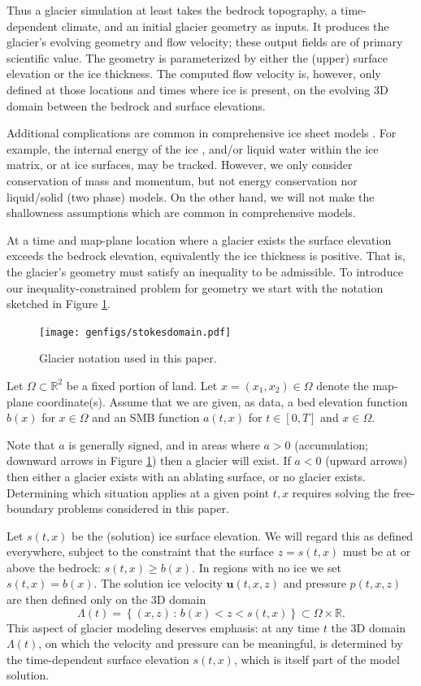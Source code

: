 \documentclass[hidelinks,onefignum,onetabnum,final]{siamart220329}  %
\newcommand{\RR}{\mathbb{R}}
\newcommand{\bu}{\mathbf{u}}
\begin{document}
Thus a glacier simulation at least takes the bedrock topography, a time-dependent climate, and an initial glacier geometry as inputs.  It produces the glacier's evolving geometry and flow velocity; these output fields are of primary scientific value.  The geometry is parameterized by either the (upper) surface elevation or the ice thickness.  The computed flow velocity is, however, only defined at those locations and times where ice is present, on the evolving 3D domain between the bedrock and surface elevations.

Additional complications are common in comprehensive ice sheet models \cite{SchoofHewitt2013}.  For example, the internal energy of the ice \cite{Aschwandenetal2012}, and/or liquid water within the ice matrix, or at ice surfaces, may be tracked.  However, we only consider conservation of mass and momentum, but not energy conservation nor liquid/solid (two phase) models.  On the other hand, we will not make the shallowness assumptions which are common in comprehensive models.

At a time and map-plane location where a glacier exists the surface elevation exceeds the bedrock elevation, equivalently the ice thickness is positive.  That is, the glacier's geometry must satisfy an inequality to be admissible.  To introduce our inequality-constrained problem for geometry we start with the notation sketched in Figure \ref{fig:stokesdomain}.

\medskip
\begin{figure}[ht]
\centering
\texttt{[image: genfigs/stokesdomain.pdf]}
\caption{Glacier notation used in this paper.}
\label{fig:stokesdomain}
\end{figure}

\medskip
Let $\Omega \subset \RR^2$ be a fixed portion of land.  Let $x=(x_1,x_2)\in\Omega$ denote the map-plane coordinate(s).  Assume that we are given, as data, a bed elevation function $b(x)$ for $x\in\Omega$ and an SMB function $a(t,x)$ for $t\in [0,T]$ and $x\in \Omega$.

Note that $a$ is generally signed, and in areas where $a>0$ (accumulation; downward arrows in Figure \ref{fig:stokesdomain}) then a glacier will exist.  If $a<0$ (upward arrows) then either a glacier exists with an ablating surface, or no glacier exists.  Determining which situation applies at a given point $t,x$ requires solving the free-boundary problems considered in this paper.

Let $s(t,x)$ be the (solution) ice surface elevation.  We will regard this as defined everywhere, subject to the constraint that the surface $z=s(t,x)$ must be at or above the bedrock: $s(t,x) \ge b(x)$.  In regions with no ice we set $s(t,x)=b(x)$.  The solution ice velocity $\bu(t,x,z)$ and pressure $p(t,x,z)$ are then defined only on the 3D domain
\begin{equation}
\Lambda(t) = \left\{(x,z)\,:\,b(x) < z < s(t,x)\right\} \subset \Omega \times \RR. \label{eq:icydomain}
\end{equation}
This aspect of glacier modeling deserves emphasis: at any time $t$ the 3D domain $\Lambda(t)$, on which the velocity and pressure can be meaningful, is determined by the time-dependent surface elevation $s(t,x)$, which is itself part of the model solution.
\end{document}
